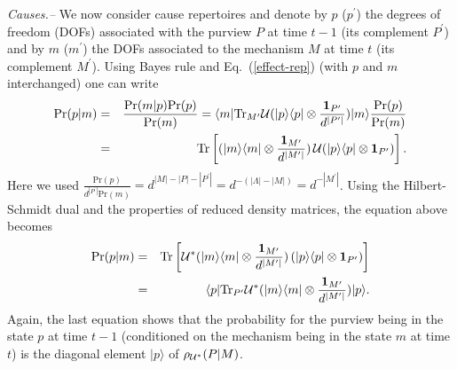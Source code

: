 \documentclass[aps,pra,groupaddress]{revtex4-1}
\begin{document}
{\em {Causes.--}} We now consider cause repertoires and denote by $p$
($p^\prime$) the degrees of freedom (DOFs) associated with the purview
$P$ at time $t-1$ (its complement $P^\prime$) and by $m$ ($m^\prime$)
the DOFs associated to the mechanism $M$ at time $t$ (its complement
$M^\prime$).
Using Bayes rule and Eq.~(\ref{effect-rep}) (with $p$ and $m$
interchanged) one can write
\begin{eqnarray}
{\mathrm{Pr}}(p|m)&=&\frac{ {\mathrm{Pr}}(m|p)  {\mathrm{Pr}}(p)      }{{\mathrm{Pr}}(m)}=  \langle m| {\mathrm{Tr}}_{M^\prime} {\cal U}(|p\rangle\langle p|\otimes \frac{  {\mathbf{1}}_{P^\prime}  }{ d^{|P^\prime|}   })|m\rangle
\frac{{\mathrm{Pr}}(p) }{{\mathrm{Pr}}(m)} \nonumber \\
&=&{\mathrm{Tr}}\left[ (|m\rangle\langle m|  \otimes \frac{  {\mathbf{1}}_{M^\prime}  }{ d^{|M^\prime|}   } )\, {\cal U}(|p\rangle\langle p|\otimes
   {\mathbf{1}}_{P^\prime})               \right].
\end{eqnarray}
Here we used
$ \frac{{\mathrm{Pr}}(p) }{   d^{|P^\prime|}   {\mathrm{Pr}}(m) }=d^{
  |M|-|P|-|P^\prime|  }=d^{-(|\Lambda|-|M|)}=d^{-|M^\prime|}$.
Using the Hilbert-Schmidt dual%
 and the properties of reduced density
matrices, the equation above becomes
\begin{eqnarray}
{\mathrm{Pr}}(p|m)&=&{\mathrm{Tr}}\left[ {\cal U}^*(|m\rangle\langle m|  \otimes \frac{  {\mathbf{1}}_{M^\prime}  }{ d^{|M^\prime|}   } )\,(|p\rangle\langle p|\otimes
   {\mathbf{1}}_{P^\prime}) \right] \nonumber \\
&=&\langle p| {\mathrm{Tr}}_{P^\prime} {\cal U}^* (|m\rangle\langle m|  \otimes \frac{  {\mathbf{1}}_{M^\prime}  }{ d^{|M^\prime|}   } ) |p\rangle.
\end{eqnarray}
Again, the last equation shows that the probability for the purview
being in the state $p$ at time $t-1$ 
(conditioned on the mechanism being in the state $m$ at time $t$)
is the diagonal element $|p\rangle$ of %
$\rho_{{\cal U}^*}(P|M)$.
%
\end{document}
